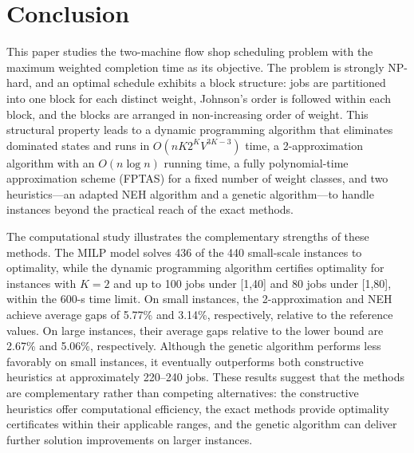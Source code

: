 ﻿\documentclass[12pt]{article}
\let\origsection\section
\renewcommand{\section}{\FloatBarrier\origsection}
\begin{document}
\begin{sloppypar}
\section{Conclusion}
\label{sec:conclusion}
This paper studies the two-machine flow shop scheduling problem with the maximum weighted completion time as its objective. 
The problem is strongly NP-hard, and an optimal schedule exhibits a block structure: 
jobs are partitioned into one block for each distinct weight, 
Johnson's order is followed within each block, and the blocks are arranged in non-increasing order of weight. 
This structural property leads to a dynamic programming algorithm that eliminates dominated states 
and runs in \(O(nK2^{K}V^{3K-3})\) time, a 2-approximation algorithm with an \(O(n\log n)\) running time, 
a fully polynomial-time approximation scheme (FPTAS) for a fixed number of weight classes, 
and two heuristics—an adapted NEH algorithm and a genetic algorithm—to handle instances beyond the practical 
reach of the exact methods.

The computational study illustrates the complementary strengths of these methods. 
The MILP model solves 436 of the 440 small-scale instances to optimality, 
while the dynamic programming algorithm certifies optimality for instances with \(K=2\) 
and up to 100 jobs under [1,40] and 80 jobs under [1,80], within the 600-s time limit. 
On small instances, the 2-approximation and NEH achieve average gaps of 5.77\% and 3.14\%, 
respectively, relative to the reference values. 
On large instances, their average gaps relative to the lower bound are 2.67\% and 5.06\%, respectively. 
Although the genetic algorithm performs less favorably on small instances, 
it eventually outperforms both constructive heuristics at approximately 220–240 jobs. 
These results suggest that the methods are complementary rather than competing alternatives: 
the constructive heuristics offer computational efficiency, 
the exact methods provide optimality certificates within their applicable ranges, 
and the genetic algorithm can deliver further solution improvements on larger instances.


\end{sloppypar}
\end{document}
